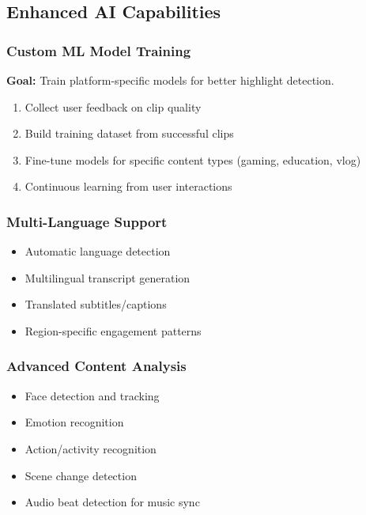 \subsection{Enhanced AI Capabilities}

\subsubsection{Custom ML Model Training}

\textbf{Goal:} Train platform-specific models for better highlight detection.

\begin{enumerate}
    \item Collect user feedback on clip quality
    \item Build training dataset from successful clips
    \item Fine-tune models for specific content types (gaming, education, vlog)
    \item Continuous learning from user interactions
\end{enumerate}

\subsubsection{Multi-Language Support}

\begin{itemize}
    \item Automatic language detection
    \item Multilingual transcript generation
    \item Translated subtitles/captions
    \item Region-specific engagement patterns
\end{itemize}

\subsubsection{Advanced Content Analysis}

\begin{itemize}
    \item Face detection and tracking
    \item Emotion recognition
    \item Action/activity recognition
    \item Scene change detection
    \item Audio beat detection for music sync
\end{itemize}

